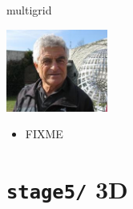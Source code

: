 \documentclass[10pt,hyperref,dvipsnames]{beamer}
\begin{document}
\begin{frame}{multigrid}

\hfill \includegraphics[width=0.25\textwidth]{figs/people/abrandt.jpg}

\vspace{-20mm}

\begin{itemize}
\item FIXME
\end{itemize}
\end{frame}


\section{\texttt{stage5/} \qquad 3D}
\end{document}
